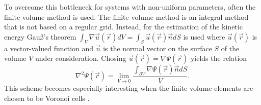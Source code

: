 To overcome this bottleneck for systems with non-uniform parameters, often the finite volume method is used.
The finite volume method is an integral method that is not based on a regular grid.
Instead, for the estimation of the kinetic energy Gau\ss's theorem $\int_V \nabla \vec{u}(\vec{r}) dV=\int_{S} \vec{u}(\vec{r}) \vec{n}dS $ is used where $\vec{u}(\vec{r})$ is a vector-valued function and $\vec{n}$ is the normal vector on the surface $S$ of the volume $V$ under consideration.
Chosing $\vec{u}(\vec{r})=\nabla\Psi(\vec{r})$ yields the relation
\begin{equation} \label{eq:kinFV}
   \nabla^2\Psi(\vec{r})=\lim_{V\rightarrow 0} \frac{ \int_{\partial V} \nabla\Psi(\vec{r}) \vec{n} dS}{V}.
\end{equation}
This scheme becomes especially interesting when the finite volume elements are chosen to be Voronoi cells \cite{Son_Chu0}.
